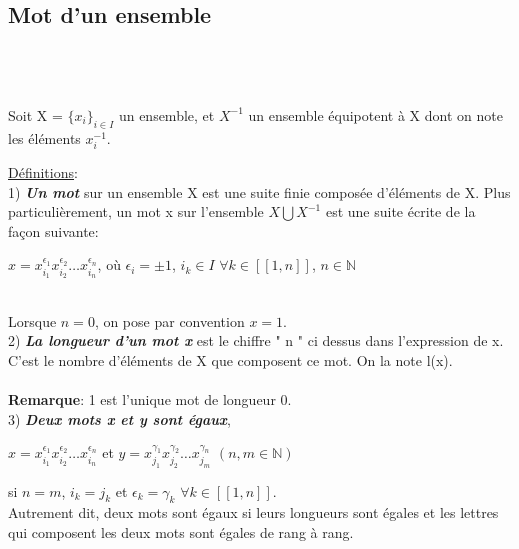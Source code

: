\documentclass{article}
\begin{document}
\subsection{Mot d'un ensemble}\\
\\
\\
Soit X = $\{x_i\}_{i \in I}$ un ensemble, et $X^{-1}$ un ensemble équipotent à X dont on note les éléments $x_i^{-1}$.
\\
\begin{definitionbox}
\underline{Définitions}: 
\\

1) \textit{\textbf{Un mot}} sur un ensemble X est une suite finie composée d'éléments de X.
Plus particulièrement, un mot x sur l'ensemble $ X \bigcup X^{-1}$ est une suite écrite de la façon suivante:\begin{center} $x = x^{\epsilon_1}_{i_1} x^{\epsilon_2}_{i_2} \dots x^{\epsilon_n}_{i_n}$, où  $\epsilon_i = \pm 1$, $i_k \in I$ \hspace{0.05cm} $\forall k \in [\![1,n]\!]$, $n\in \mathbb{N}$\end{center}\\

Lorsque $n=0$, on pose par convention $x=1$.
\\

2) \textit{\textbf{La longueur d'un mot x}} est le chiffre " n " ci dessus dans l'expression de x. C'est le nombre d'éléments de X que composent ce mot. On la note l(x).\\
\\\textbf{Remarque}: 1 est l'unique mot de longueur 0.
\\

3) \textit{\textbf{Deux mots x et y sont égaux}}, 
\begin{center}$x = x^{\epsilon_1}_{i_1} x^{\epsilon_2}_{i_2} \dots x^{\epsilon_n}_{i_n}$ et $y = x^{\gamma_1}_{j_1} x^{\gamma_2}_{j_2} \dots x^{\gamma_n}_{j_m}$  $(n,m \in \mathbb{N})$ \end{center} 

si $n=m$, \hspace{0.05cm} $i_k=j_k$ et $\epsilon_k=\gamma_k$ \hspace{0.05cm} $\forall k \in [\![1,n]\!]$.
\\

Autrement dit, deux mots sont égaux si leurs longueurs sont égales et les lettres qui composent les deux mots sont égales de rang à rang.
\end{definitionbox}
\end{document}
